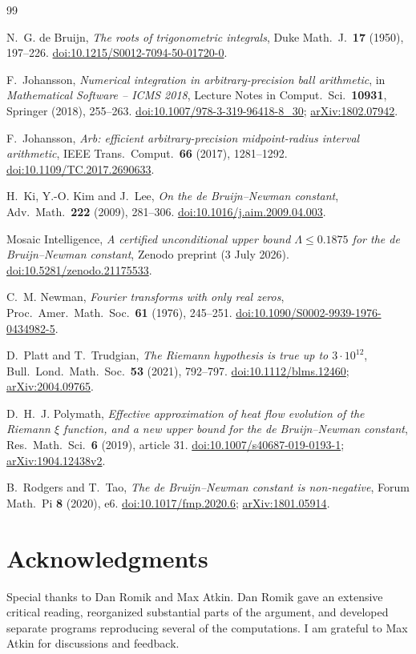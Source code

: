 \documentclass[11pt]{article}
\theoremstyle{definition}
\begin{document}
\FloatBarrier

\begin{thebibliography}{99}

N.~G. de Bruijn,
\emph{The roots of trigonometric integrals},
Duke Math.\ J.\ \textbf{17} (1950), 197--226.
\href{https://doi.org/10.1215/S0012-7094-50-01720-0}{doi:10.1215/S0012-7094-50-01720-0}.

F.~Johansson,
\emph{Numerical integration in arbitrary-precision ball arithmetic},
in \emph{Mathematical Software -- ICMS 2018}, Lecture Notes in Comput.\ Sci.\
\textbf{10931}, Springer (2018), 255--263.
\href{https://doi.org/10.1007/978-3-319-96418-8_30}{doi:10.1007/978-3-319-96418-8\_30};
\href{https://arxiv.org/abs/1802.07942}{arXiv:1802.07942}.

F.~Johansson,
\emph{Arb: efficient arbitrary-precision midpoint-radius interval arithmetic},
IEEE Trans.\ Comput.\ \textbf{66} (2017), 1281--1292.
\href{https://doi.org/10.1109/TC.2017.2690633}{doi:10.1109/TC.2017.2690633}.

H.~Ki, Y.-O. Kim and J.~Lee,
\emph{On the de Bruijn--Newman constant},
Adv.\ Math.\ \textbf{222} (2009), 281--306.
\href{https://doi.org/10.1016/j.aim.2009.04.003}{doi:10.1016/j.aim.2009.04.003}.

Mosaic Intelligence,
\emph{A certified unconditional upper bound $\Lambda\le0.1875$ for the
de Bruijn--Newman constant}, Zenodo preprint (3 July 2026).
\href{https://doi.org/10.5281/zenodo.21175533}{doi:10.5281/zenodo.21175533}.

C.~M. Newman,
\emph{Fourier transforms with only real zeros},
Proc.\ Amer.\ Math.\ Soc.\ \textbf{61} (1976), 245--251.
\href{https://doi.org/10.1090/S0002-9939-1976-0434982-5}{doi:10.1090/S0002-9939-1976-0434982-5}.

D.~Platt and T.~Trudgian,
\emph{The Riemann hypothesis is true up to $3\cdot10^{12}$},
Bull.\ Lond.\ Math.\ Soc.\ \textbf{53} (2021), 792--797.
\href{https://doi.org/10.1112/blms.12460}{doi:10.1112/blms.12460};
\href{https://arxiv.org/abs/2004.09765}{arXiv:2004.09765}.

D.~H.~J. Polymath,
\emph{Effective approximation of heat flow evolution of the Riemann
$\xi$ function, and a new upper bound for the de Bruijn--Newman constant},
Res.\ Math.\ Sci.\ \textbf{6} (2019), article 31.
\href{https://doi.org/10.1007/s40687-019-0193-1}{doi:10.1007/s40687-019-0193-1};
\href{https://arxiv.org/abs/1904.12438}{arXiv:1904.12438v2}.

B.~Rodgers and T.~Tao,
\emph{The de Bruijn--Newman constant is non-negative},
Forum Math.\ Pi \textbf{8} (2020), e6.
\href{https://doi.org/10.1017/fmp.2020.6}{doi:10.1017/fmp.2020.6};
\href{https://arxiv.org/abs/1801.05914}{arXiv:1801.05914}.

\end{thebibliography}

\section*{Acknowledgments}

Special thanks to Dan Romik and Max Atkin.  Dan Romik gave an extensive
critical reading, reorganized substantial parts of the argument, and developed
separate programs reproducing several of the computations.  I am grateful to
Max Atkin for discussions and feedback.
\end{document}
